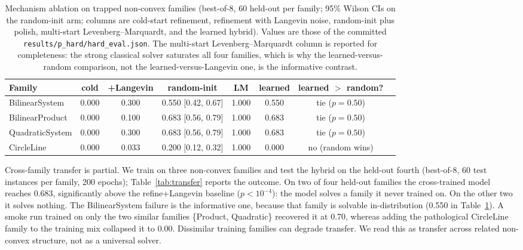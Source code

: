 \begin{table}[ht]
\centering
\caption{Mechanism ablation on trapped non-convex families (best-of-8, 60 held-out per
family; 95\% Wilson CIs on the random-init arm; columns are cold-start refinement, refinement with Langevin noise, random-init plus polish, multi-start Levenberg--Marquardt, and the learned hybrid). Values are those of the committed
\texttt{results/p\_hard/hard\_eval.json}. The multi-start Levenberg--Marquardt column is
reported for completeness: the strong classical solver saturates all four families, which is
why the learned-versus-random comparison, not the learned-versus-Langevin one, is the
informative contrast.}
\label{tab:hybrid}
\footnotesize
\setlength{\tabcolsep}{4pt}
\begin{tabular}{lccccccl}
\toprule
Family & cold & +Langevin & random-init & LM & learned & learned $>$ random? \\
\midrule
BilinearSystem  & 0.000 & 0.300 & 0.550 [0.42, 0.67] & 1.000 & 0.550 & tie ($p{=}0.50$) \\
BilinearProduct & 0.000 & 0.100 & 0.683 [0.56, 0.79] & 1.000 & 0.683 & tie ($p{=}0.50$) \\
QuadraticSystem & 0.000 & 0.300 & 0.683 [0.56, 0.79] & 1.000 & 0.683 & tie ($p{=}0.50$) \\
CircleLine      & 0.000 & 0.033 & 0.200 [0.12, 0.32] & 1.000 & 0.000 & no (random wins) \\
\bottomrule
\end{tabular}
\end{table}

\label{app:transfer}
Cross-family transfer is partial. We train on three non-convex families and test the hybrid
on the held-out fourth (best-of-8, 60 test instances per family, 200 epochs);
Table~\ref{tab:transfer} reports the outcome. On two of four held-out families the
cross-trained model reaches 0.683, significantly above the refine+Langevin baseline
($p < 10^{-4}$): the model solves a family it never trained on. On the other two it solves
nothing. The BilinearSystem failure is the informative one, because that family is solvable
in-distribution (0.550 in Table~\ref{tab:hybrid}). A smoke run trained on only the two
similar families \{Product, Quadratic\} recovered it at 0.70, whereas adding the pathological
CircleLine family to the training mix collapsed it to 0.00. Dissimilar training families can
degrade transfer. We read this as transfer across related non-convex structure, not
as a universal solver.

